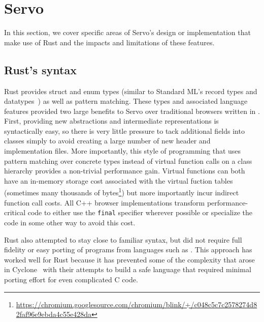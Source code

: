 \section{Servo}
\label{sec:servo}
In this section, we cover specific areas of Servo's design or implementation that make use of Rust
and the impacts and limitations of these features.

\subsection{Rust's syntax}
Rust provides struct and enum types (similar to Standard ML's record types and datatypes~\cite{sml97-definition}) as
well as pattern matching.
These types and associated language features provided two large benefits to Servo over traditional browsers
written in \Cplusplus{}.
First, providing new abstractions and intermediate representations is syntactically easy, so there is very little
pressure to tack additional fields into classes simply to avoid creating a large number of new header and implementation
files.
More importantly, this style of programming that uses pattern matching over concrete types instead of
virtual function calls on a class hierarchy provides a non-trivial performance gain.
Virtual functions can both have an in-memory storage cost associated with the virtual fuction tables (sometimes many thousands of bytes\footnote{\url{https://chromium.googlesource.com/chromium/blink/+/c048c5c7c2578274d82faf96e9ebda4c55e428da}}) but more importantly
incur indirect function call costs.
All C++ browser implementations transform performance-critical code to either use the \lstinline[language=C]{final}
specifier wherever possible or specialize the code in some other way to avoid this cost.

Rust also attempted to stay close to familiar syntax, but did not require full fidelity or easy porting of
programs from languages such as \Cplusplus{}.
This approach has worked well for Rust because it has prevented some of the complexity that arose in
Cyclone~\cite{cyclone} with their attempts to build a safe language that required minimal porting effort
for even complicated C code.

